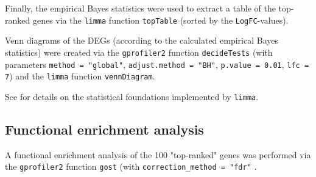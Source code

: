 Finally, the empirical Bayes statistics were used to extract a table of the top-ranked genes via the \verb|limma| function \verb|topTable| (sorted by the \verb|LogFC|-values).

Venn diagrams of the DEGs (according to the calculated empirical Bayes statistics) were created via the \verb|gprofiler2| function \verb|decideTests| (with parameters \verb|method = "global"|, \verb|adjust.method = "BH"|, \verb|p.value = 0.01|, \verb|lfc = 7|) and the \verb|limma| function \verb|vennDiagram|.

See \autocite{limma2015} for details on the statistical foundations implemented by \verb|limma|.

\subsection{Functional enrichment analysis}

A functional enrichment analysis of the 100 "top-ranked" genes was performed via the \verb|gprofiler2| function \verb|gost| (with \verb|correction_method = "fdr"| \autocite{R-gprofiler2}.